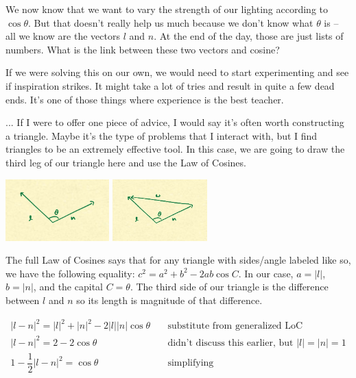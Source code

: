 \documentclass{article}
\begin{document}
We now know that we want to vary the strength of our lighting according to $\cos \theta$.
But that doesn't really help us much because we don't know what $\theta$ is -- all we know are the vectors $l$ and $n$.
At the end of the day, those are just lists of numbers.
What is the link between these two vectors and cosine?

If we were solving this on our own, we would need to start experimenting and see if inspiration strikes.
It might take a lot of tries and result in quite a few dead ends.
It's one of those things where experience is the best teacher.

... If I were to offer one piece of advice, I would say it's often worth constructing a triangle.
Maybe it's the type of problems that I interact with, but I find triangles to be an extremely effective tool.
In this case, we are going to draw the third leg of our triangle here and use the Law of Cosines.

\begin{center}
	\includegraphics[width=0.3\textwidth,frame]{assets/ln.jpg}
	\hspace{0.2\textwidth}
	\includegraphics[width=0.2735\textwidth,frame]{assets/lnw.jpg}
\end{center}

The full Law of Cosines says that for any triangle with sides/angle labeled like so, we have the following equality: $c^2 = a^2 + b^2 - 2ab \cos C$.
In our case, $a = |l|$, $b = |n|$, and the capital $C = \theta$.
The third side of our triangle is the difference between $l$ and $n$ so its length is magnitude of that difference.

\begin{align*}
|l-n|^2 = |l|^2 + |n|^2 - 2 |l| |n| \cos \theta & \quad \text{substitute from generalized LoC} \\
|l-n|^2 = 2 - 2 \cos \theta & \quad \text{didn't discuss this earlier, but } |l| = |n| = 1 \\
1 - \dfrac{1}{2}|l-n|^2 = \cos \theta & \quad \text{simplifying}
\end{align*}
\end{document}

